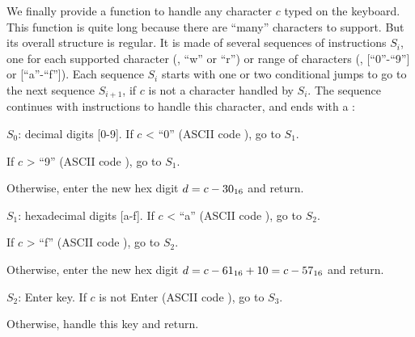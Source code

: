 We finally provide a function to handle any character $c$ typed on the
keyboard. This function is quite long because there are ``many'' characters to
support. But its overall structure is regular. It is made of several sequences
of instructions $S_i$, one for each supported character (\eg, ``w'' or ``r'')
or range of characters (\eg, [``0''-``9''] or [``a''-``f'']). Each sequence
$S_i$ starts with one or two conditional jumps to go to the next sequence
$S_{i+1}$, if $c$ is not a character handled by $S_i$. The sequence continues
with instructions to handle this character, and ends with a :\bigskip

\begin{paracol}{2}

$S_0$: decimal digits [0-9]. If $c$ < ``0'' (ASCII code ), go to $S_1$.


If $c$ > ``9'' (ASCII code ), go to $S_1$.


Otherwise, enter the new hex digit $d=c-30_{16}$ and return.


$S_1$: hexadecimal digits [a-f]. If $c$ < ``a'' (ASCII code ), go to
$S_2$.


If $c$ > ``f'' (ASCII code ), go to $S_2$.


Otherwise, enter the new hex digit $d=c-61_{16}+10=c-57_{16}$ and return.


$S_2$: Enter key. If $c$ is not Enter (ASCII code ), go to $S_3$.


Otherwise, handle this key and return.


\end{paracol}
